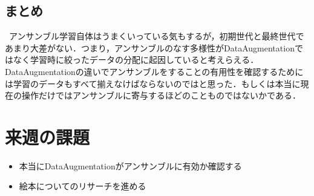 \documentclass[twocolumn]{jarticle}     %
\begin{document}
\subsection{まとめ}
\ アンサンブル学習自体はうまくいっている気もするが，初期世代と最終世代であまり大差がない．つまり，アンサンブルのなす多様性がDataAugmentationではなく学習時に絞ったデータの分配に起因していると考えらえる．DataAugmentationの違いでアンサンブルをすることの有用性を確認するためには学習のデータもすべて揃えなけばならないのではと思った．もしくは本当に現在の操作だけではアンサンブルに寄与するほどのことものではないかである．
\section{来週の課題}
\begin{itemize}
	\item 本当にDataAugmentationがアンサンブルに有効か確認する
	\item 絵本についてのリサーチを進める
\end{itemize}



\end{document}

